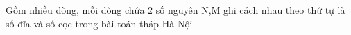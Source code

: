 Gồm nhiều dòng, mỗi dòng chứa 2 số nguyên N,M ghi cách nhau theo thứ tự là số đĩa và số cọc trong bài toán tháp Hà Nội